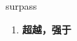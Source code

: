 
\begin{frame}
{\huge surpass}
\begin{center}
\begin{enumerate}\Large
  \item \textbf{超越，强于}
\end{enumerate}
\end{center}
\end{frame}
